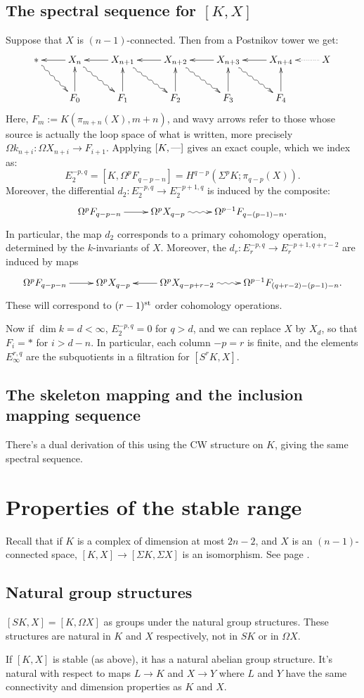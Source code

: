 \documentclass[11pt]{article}
\begin{document}
\subsection{The spectral sequence for \texorpdfstring{$[K,X]$}{[K,X]}}
Suppose that $X$ is $(n-1)$-connected. Then from a Postnikov tower we get:
\[\xymatrix{
{*}\ar@{~>}[rd]&
X_n\ar[l]\ar@{~>}[rd]&
X_{n+1}\ar[l]\ar@{~>}[rd]&
X_{n+2}\ar[l]\ar@{~>}[rd]&
X_{n+3}\ar[l]\ar@{~>}[rd]&
X_{n+4}\ar[l]
&X\ar@{.>}[l]\\
&F_0\ar[u]&F_1\ar[u]&F_2\ar[u]&F_3\ar[u]&F_4\ar[u]
}\]
Here, $F_m:=K(\pi_{m+n}(X),m+n)$, and wavy arrows refer to those whose source is
actually the loop space of what is written, more precisely
$\Omega k_{n+i}:\Omega X_{n+i}\to F_{i+1}$.
Applying $[K,\textup{---}]$ gives an exact couple, which we index as:
\[E_2^{-p,q}=[K,\Omega^p F_{q-p-n}]=H^{q-p}(\Sigma^pK;\pi_{q-p}(X)).\]
Moreover, the differential $d_2:E_2^{-p,q}\to E_2^{-p+1,q}$ is induced by the
composite:
\[\xymatrix{
\Omega^pF_{q-p-n}\ar[r]&\Omega^p X_{q-p}\ar@{~>}[r]&\Omega^{p-1}F_{q-(p-1)-n}.
}\]
In particular, the map $d_2$ corresponds to a primary cohomology operation,
determined by the $k$-invariants of $X$.
Moreover, the $d_r:E_r^{-p,q}\to E_r^{-p+1,q+r-2}$ are induced by maps
\[\xymatrix{
\Omega^pF_{q-p-n}\ar[r]&\Omega^p X_{q-p}&
\Omega^p X_{q-p+r-2}\ar[l]\ar@{~>}[r]
&\Omega^{p-1}F_{(q+r-2)-(p-1)-n}.
}\]
These will correspond to $(r-1)^\text{st}$ order cohomology operations.

Now if $\dim k=d<\infty$, $E_2^{-p,q}=0$ for $q>d$, and we can replace $X$ by
$X_d$, so that $F_i=*$ for $i>d-n$. In particular, each column $-p=r$ is finite,
and the elements $E_\infty^{r,q}$ are the subquotients in a filtration for
$[S^rK,X]$.
\subsection{The skeleton mapping and the inclusion mapping sequence}
There's a dual derivation of this using the CW structure on $K$, giving the same
spectral sequence.
\section{Properties of the stable range}
Recall that if $K$ is a complex of dimension at most $2n-2$, and $X$ is an
$(n-1)$-connected space, $[K,X]\to[\Sigma K,\Sigma X]$ is an isomorphism. See
page \pageref{StableRange}.
\subsection{Natural group structures}
$[SK,X]=[K,\Omega X]$ as groups under the natural group structures. These
structures are natural in $K$ and $X$ respectively, not in $SK$ or in $\Omega
X$.
\begin{prop*}
If $[K,X]$ is stable (as above), it has a natural abelian group structure. It's
natural with respect to maps $L\to K$ and $X\to Y$ where $L$ and $Y$ have the
same connectivity and dimension properties as $K$ and $X$.
\end{prop*}
\end{document}
